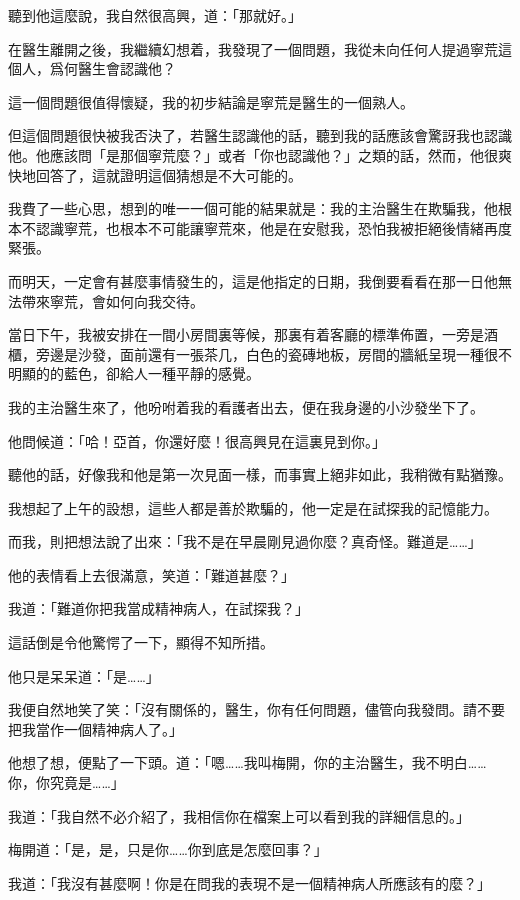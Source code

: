 聽到他這麼說，我自然很高興，道：「那就好。」



在醫生離開之後，我繼續幻想着，我發現了一個問題，我從未向任何人提過寧荒這個人，爲何醫生會認識他？

這一個問題很值得懷疑，我的初步結論是寧荒是醫生的一個熟人。

但這個問題很快被我否決了，若醫生認識他的話，聽到我的話應該會驚訝我也認識他。他應該問「是那個寧荒麼？」或者「你也認識他？」之類的話，然而，他很爽快地回答了，這就證明這個猜想是不大可能的。

我費了一些心思，想到的唯一一個可能的結果就是：我的主治醫生在欺騙我，他根本不認識寧荒，也根本不可能讓寧荒來，他是在安慰我，恐怕我被拒絕後情緒再度緊張。

而明天，一定會有甚麼事情發生的，這是他指定的日期，我倒要看看在那一日他無法帶來寧荒，會如何向我交待。



當日下午，我被安排在一間小房間裏等候，那裏有着客廳的標準佈置，一旁是酒櫃，旁邊是沙發，面前還有一張茶几，白色的瓷磚地板，房間的牆紙呈現一種很不明顯的的藍色，卻給人一種平靜的感覺。

我的主治醫生來了，他吩咐着我的看護者出去，便在我身邊的小沙發坐下了。



他問候道：「哈！亞首，你還好麼！很高興見在這裏見到你。」

聽他的話，好像我和他是第一次見面一樣，而事實上絕非如此，我稍微有點猶豫。

我想起了上午的設想，這些人都是善於欺騙的，他一定是在試探我的記憶能力。

而我，則把想法說了出來：「我不是在早晨剛見過你麼？真奇怪。難道是……」

他的表情看上去很滿意，笑道：「難道甚麼？」

我道：「難道你把我當成精神病人，在試探我？」

這話倒是令他驚愕了一下，顯得不知所措。

他只是呆呆道：「是……」

我便自然地笑了笑：「沒有關係的，醫生，你有任何問題，儘管向我發問。請不要把我當作一個精神病人了。」

他想了想，便點了一下頭。道：「嗯……我叫梅開，你的主治醫生，我不明白……你，你究竟是……」

我道：「我自然不必介紹了，我相信你在檔案上可以看到我的詳細信息的。」

梅開道：「是，是，只是你……你到底是怎麼回事？」

我道：「我沒有甚麼啊！你是在問我的表現不是一個精神病人所應該有的麼？」

